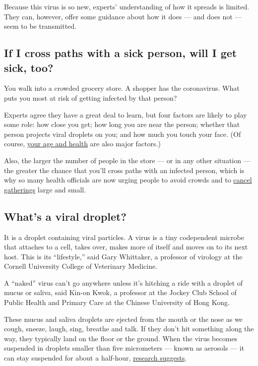 Because this virus is so new, experts' understanding of how it spreads
is limited. They can, however, offer some guidance about how it does ---
and does not --- seem to be transmitted.

\hypertarget{if-i-cross-paths-with-a-sick-person-will-i-get-sick-too}{%
\subsection{If I cross paths with a sick person, will I get sick,
too?}\label{if-i-cross-paths-with-a-sick-person-will-i-get-sick-too}}

You walk into a crowded grocery store. A shopper has the coronavirus.
What puts you most at risk of getting infected by that person?

Experts agree they have a great deal to learn, but four factors are
likely to play some role: how close you get; how long you are near the
person; whether that person projects viral droplets on you; and how much
you touch your face. (Of course,
\href{https://www.nytimes.com/2020/02/20/health/coronavirus-men-women.html}{your
age and health} are also major factors.)

Also, the larger the number of people in the store --- or in any other
situation --- the greater the chance that you'll cross paths with an
infected person, which is why so many health officials are now urging
people to avoid crowds and to
\href{https://www.cdc.gov/coronavirus/2019-ncov/community/large-events/mass-gatherings-ready-for-covid-19.html}{cancel
gatherings} large and small.

\hypertarget{whats-a-viral-droplet}{%
\subsection{What's a viral droplet?}\label{whats-a-viral-droplet}}

It is a droplet containing viral particles. A virus is a tiny
codependent microbe that attaches to a cell, takes over, makes more of
itself and moves on to its next host. This is its ``lifestyle,'' said
Gary Whittaker, a professor of virology at the Cornell University
College of Veterinary Medicine.

A ``naked'' virus can't go anywhere unless it's hitching a ride with a
droplet of mucus or saliva, said Kin-on Kwok, a professor at the Jockey
Club School of Public Health and Primary Care at the Chinese University
of Hong Kong.

These mucus and saliva droplets are ejected from the mouth or the nose
as we cough, sneeze, laugh, sing, breathe and talk. If they don't hit
something along the way, they typically land on the floor or the ground.
When the virus becomes suspended in droplets smaller than five
micrometers --- known as aerosols --- it can stay suspended for about a
half-hour,
\href{https://www.nytimes.com/2020/03/17/health/coronavirus-surfaces-aerosols.html}{research
suggests}.

